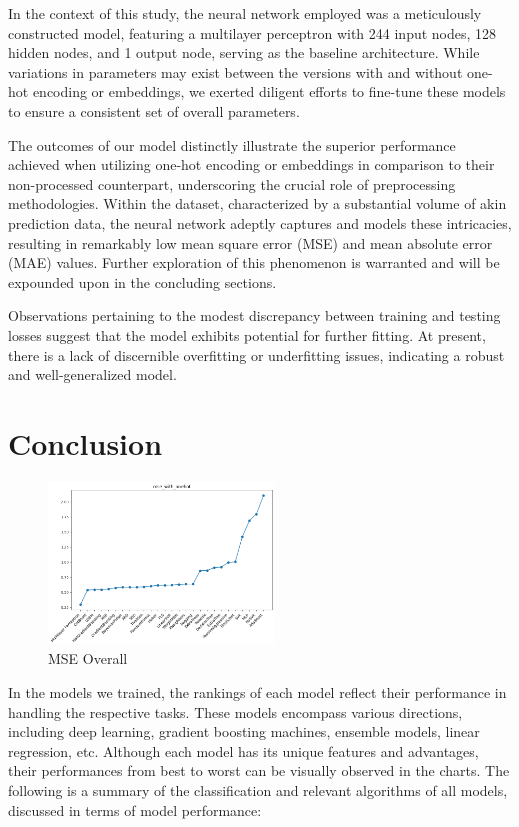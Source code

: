 \documentclass[twocolumn]{article}
\begin{document}
In the context of this study, the neural network employed was a meticulously constructed model, featuring a multilayer perceptron with 244 input nodes, 128 hidden nodes, and 1 output node, serving as the baseline architecture. While variations in parameters may exist between the versions with and without one-hot encoding or embeddings, we exerted diligent efforts to fine-tune these models to ensure a consistent set of overall parameters.

The outcomes of our model distinctly illustrate the superior performance achieved when utilizing one-hot encoding or embeddings in comparison to their non-processed counterpart, underscoring the crucial role of preprocessing methodologies. Within the dataset, characterized by a substantial volume of akin prediction data, the neural network adeptly captures and models these intricacies, resulting in remarkably low mean square error (MSE) and mean absolute error (MAE) values. Further exploration of this phenomenon is warranted and will be expounded upon in the concluding sections.

Observations pertaining to the modest discrepancy between training and testing losses suggest that the model exhibits potential for further fitting. At present, there is a lack of discernible overfitting or underfitting issues, indicating a robust and well-generalized model.

\section{Conclusion}
\begin{figure}[H]
\centering
\includegraphics[width=6cm]{mse_with_onehot.png} 
\caption{MSE Overall} 
\label{Fig.mse_with_onehot} 
\end{figure}
In the models we trained, the rankings of each model reflect their performance in handling the respective tasks. These models encompass various directions, including deep learning, gradient boosting machines, ensemble models, linear regression, etc. Although each model has its unique features and advantages, their performances from best to worst can be visually observed in the charts. The following is a summary of the classification and relevant algorithms of all models, discussed in terms of model performance:
\end{document}
